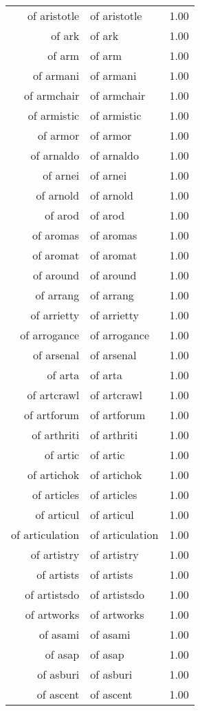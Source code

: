 \begin{table}[ht]
\begin{tabular}{rlr}
  of aristotle & of aristotle & 1.00 \\ 
  of ark & of ark & 1.00 \\ 
  of arm & of arm & 1.00 \\ 
  of armani & of armani & 1.00 \\ 
  of armchair & of armchair & 1.00 \\ 
  of armistic & of armistic & 1.00 \\ 
  of armor & of armor & 1.00 \\ 
  of arnaldo & of arnaldo & 1.00 \\ 
  of arnei & of arnei & 1.00 \\ 
  of arnold & of arnold & 1.00 \\ 
  of arod & of arod & 1.00 \\ 
  of aromas & of aromas & 1.00 \\ 
  of aromat & of aromat & 1.00 \\ 
  of around & of around & 1.00 \\ 
  of arrang & of arrang & 1.00 \\ 
  of arrietty & of arrietty & 1.00 \\ 
  of arrogance & of arrogance & 1.00 \\ 
  of arsenal & of arsenal & 1.00 \\ 
  of arta & of arta & 1.00 \\ 
  of artcrawl & of artcrawl & 1.00 \\ 
  of artforum & of artforum & 1.00 \\ 
  of arthriti & of arthriti & 1.00 \\ 
  of artic & of artic & 1.00 \\ 
  of artichok & of artichok & 1.00 \\ 
  of articles & of articles & 1.00 \\ 
  of articul & of articul & 1.00 \\ 
  of articulation & of articulation & 1.00 \\ 
  of artistry & of artistry & 1.00 \\ 
  of artists & of artists & 1.00 \\ 
  of artistsdo & of artistsdo & 1.00 \\ 
  of artworks & of artworks & 1.00 \\ 
  of asami & of asami & 1.00 \\ 
  of asap & of asap & 1.00 \\ 
  of asburi & of asburi & 1.00 \\ 
  of ascent & of ascent & 1.00 \\ 

\end{tabular}
\end{table}
